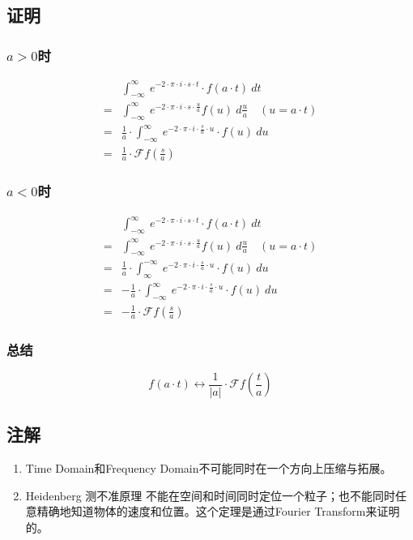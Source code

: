 \subsection{证明}
\subsubsection{$a>0$时}
\begin{align*}
	  & \int_{-\infty}^{\infty}\ e^{-2\cdot \pi\cdot i\cdot s\cdot t}\cdot f(a\cdot t)\ dt                          \\
	= & \int_{-\infty}^{\infty}\ e^{-2\cdot \pi\cdot i\cdot s\cdot \frac{u}{a}}f(u)\ d\frac{u}{a}\quad (u=a\cdot t) \\
	= & \frac{1}{a}\cdot \int_{-\infty}^{\infty}\ e^{-2\cdot \pi\cdot i\cdot \frac{s}{a}\cdot u}\cdot f(u)\ du      \\
	= & \frac{1}{a}\cdot \mathcal{F}f(\frac{s}{a})
\end{align*}
\subsubsection{$a<0$时}
\begin{align*}
	  & \int_{-\infty}^{\infty}\ e^{-2\cdot \pi\cdot i\cdot s\cdot t}\cdot f(a\cdot t)\ dt                          \\
	= & \int_{-\infty}^{\infty}\ e^{-2\cdot \pi\cdot i\cdot s\cdot \frac{u}{a}}f(u)\ d\frac{u}{a}\quad (u=a\cdot t) \\
	= & \frac{1}{a}\cdot \int_{\infty}^{-\infty}\ e^{-2\cdot \pi\cdot i\cdot \frac{s}{a}\cdot u}\cdot f(u)\ du      \\
	= & -\frac{1}{a}\cdot \int_{-\infty}^{\infty}\ e^{-2\cdot \pi\cdot i\cdot \frac{s}{a}\cdot u}\cdot f(u)\ du     \\
	= & -\frac{1}{a}\cdot \mathcal{F}f(\frac{s}{a})
\end{align*}
\subsubsection{总结}
$$
	f(a\cdot t)\leftrightarrow \frac{1}{|a|}\cdot \mathcal{F}f(\frac{t}{a})
$$
\subsection{注解}
\begin{enumerate}
	\item Time Domain和Frequency Domain不可能同时在一个方向上压缩与拓展。
	\item Heidenberg 测不准原理
	      不能在空间和时间同时定位一个粒子；也不能同时任意精确地知道物体的速度和位置。这个定理是通过Fourier Transform来证明的。
\end{enumerate}
